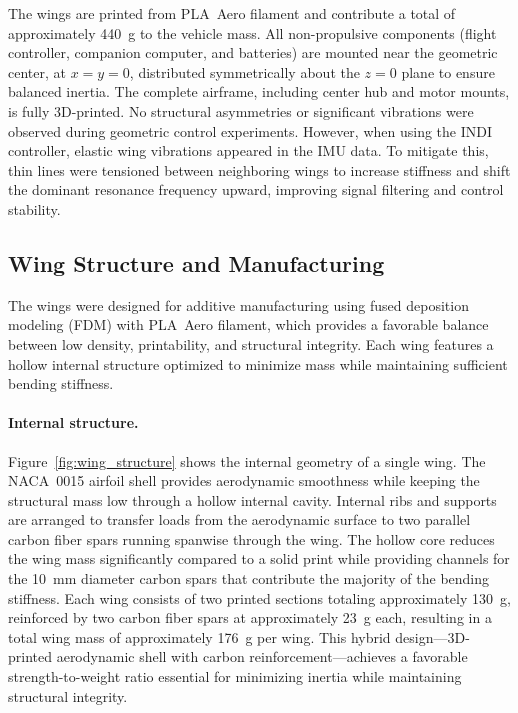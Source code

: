 The wings are printed from PLA~Aero filament and contribute a total of approximately \SI{440}{\gram} to the vehicle mass.  
All non-propulsive components (flight controller, companion computer, and batteries) are mounted near the geometric center, at \(x=y=0\), distributed symmetrically about the \(z=0\) plane to ensure balanced inertia.  
The complete airframe, including center hub and motor mounts, is fully 3D-printed.  
No structural asymmetries or significant vibrations were observed during geometric control experiments.  
However, when using the INDI controller, elastic wing vibrations appeared in the IMU data.  
To mitigate this, thin lines were tensioned between neighboring wings to increase stiffness and shift the dominant resonance frequency upward, improving signal filtering and control stability.

\subsection{Wing Structure and Manufacturing}

The wings were designed for additive manufacturing using fused deposition modeling (FDM) with PLA~Aero filament, which provides a favorable balance between low density, printability, and structural integrity.
Each wing features a hollow internal structure optimized to minimize mass while maintaining sufficient bending stiffness.

\paragraph{Internal structure.}
Figure~\ref{fig:wing_structure} shows the internal geometry of a single wing.
The NACA~0015 airfoil shell provides aerodynamic smoothness while keeping the structural mass low through a hollow internal cavity.
Internal ribs and supports are arranged to transfer loads from the aerodynamic surface to two parallel carbon fiber spars running spanwise through the wing.
The hollow core reduces the wing mass significantly compared to a solid print while providing channels for the \SI{10}{\milli\meter} diameter carbon spars that contribute the majority of the bending stiffness.
Each wing consists of two printed sections totaling approximately \SI{130}{\gram}, reinforced by two carbon fiber spars at approximately \SI{23}{\gram} each, resulting in a total wing mass of approximately \SI{176}{\gram} per wing.
This hybrid design—3D-printed aerodynamic shell with carbon reinforcement—achieves a favorable strength-to-weight ratio essential for minimizing inertia while maintaining structural integrity.


